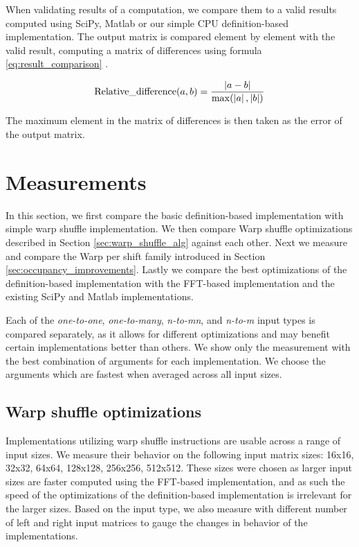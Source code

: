 When validating results of a computation, we compare them to a valid results computed using SciPy, Matlab or our simple CPU definition-based implementation. The output matrix is compared element by element with the valid result, computing a matrix of differences using formula \ref{eq:result_comparison} \citep{wiki:relative_difference}.

\begin{equation}
\label{eq:result_comparison}
\mathrm{Relative\_difference }(a, b) = \frac{\left|{a - b}\right|}{\max(\left|{a}\right|, \left|{b}\right|)}
\end{equation}

The maximum element in the matrix of differences is then taken as the error of the output matrix.

\section{Measurements}

In this section, we first compare the basic definition-based implementation with simple warp shuffle implementation. We then compare Warp shuffle optimizations described in Section \ref{sec:warp_shuffle_alg} against each other. Next we measure and compare the Warp per shift family introduced in Section \ref{sec:occupancy_improvements}. Lastly we compare the best optimizations of the definition-based implementation with the FFT-based implementation and the existing SciPy and Matlab implementations.


Each of the \textit{one-to-one}, \textit{one-to-many}, \textit{n-to-mn}, and \textit{n-to-m} input types is compared separately, as it allows for different optimizations and may benefit certain implementations better than others. We show only the measurement with the best combination of arguments for each implementation. We choose the arguments which are fastest when averaged across all input sizes. %


\subsection{Warp shuffle optimizations}
\label{sec:results_warp_shuffle}

Implementations utilizing warp shuffle instructions are usable across a range of input sizes. We measure their behavior on the following input matrix sizes: 16x16, 32x32, 64x64, 128x128, 256x256, 512x512. These sizes were chosen as larger input sizes are faster computed using the FFT-based implementation, and as such the speed of the optimizations of the definition-based implementation is irrelevant for the larger sizes. Based on the input type, we also measure with different number of left and right input matrices to gauge the changes in behavior of the implementations.

